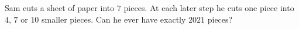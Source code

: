 Sam cuts a sheet of paper into $7$ pieces. At each later step he cuts one piece into $4$, $7$ or $10$ smaller pieces. Can he ever have exactly $2021$ pieces?
